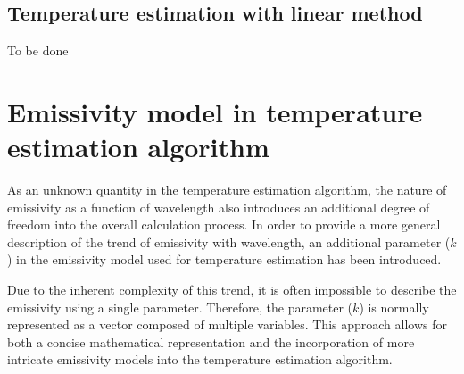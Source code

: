 \subsection{Temperature estimation with linear method}
To be done


\section{Emissivity model in temperature estimation algorithm}%
As an unknown quantity in the temperature estimation algorithm, the nature of emissivity 
as a function of wavelength also introduces an additional degree of freedom 
into the overall calculation process. In order to provide a more general description of 
the trend of emissivity with wavelength, an additional parameter ($k$) in the 
emissivity model used for temperature estimation has been introduced.


Due to the inherent complexity of this trend, it is often impossible to describe 
the emissivity using a single parameter. Therefore, the parameter ($k$) is normally 
represented as a vector composed of multiple variables. This approach allows for both a 
concise mathematical representation and the incorporation of more 
intricate emissivity models into the temperature estimation algorithm.


%
%

